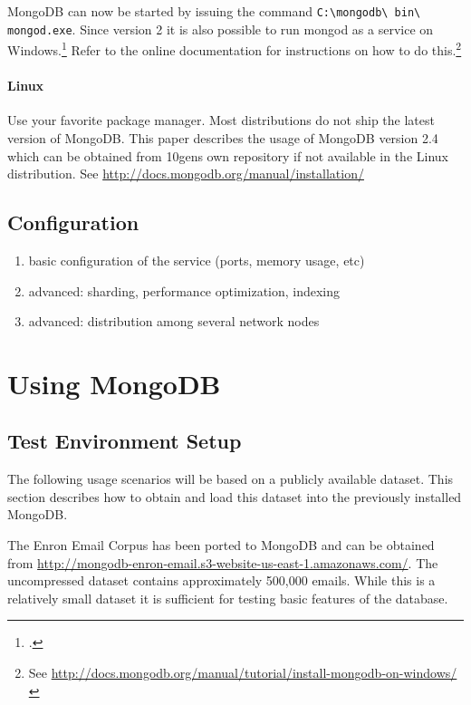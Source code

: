 MongoDB can now be started by issuing the command \texttt{C:\textbackslash mongodb\textbackslash\- bin\textbackslash\- mongod.exe}.
Since version 2 it is also possible to run mongod as a service on Windows.\footcite[Cf.][]{mongo_install_win} Refer
to the online documentation for instructions on how to do 
this.\footnote{See \url{http://docs.mongodb.org/manual/tutorial/install-mongodb-on-windows/}}

\paragraph{Linux}
\label{sec:installation-linux}
Use your favorite package manager.
Most distributions do not ship the latest version of MongoDB. This paper describes the usage of
MongoDB version 2.4 which can be obtained from 10gens own repository if not available in the
Linux distribution. See \url{http://docs.mongodb.org/manual/installation/}

\subsection{Configuration}
\label{sec:configuration}

\begin{enumerate}
  \item basic configuration of the service (ports, memory usage, etc)
  \item advanced: sharding, performance optimization, indexing
  \item advanced: distribution among several network nodes
\end{enumerate}
    
    
\newpage
\section{Using MongoDB}
\label{sec:usage}

\subsection{Test Environment Setup}
\label{sec:test-environment}

The following usage scenarios will be based on a publicly available dataset.
This section describes how to obtain and load this dataset into the previously
installed MongoDB.

The Enron Email Corpus has been ported to MongoDB and can be obtained from
\url{http://mongodb-enron-email.s3-website-us-east-1.amazonaws.com/}.
The uncompressed dataset contains approximately 500,000 emails.
While this is a relatively small dataset it is sufficient for
testing basic features of the database.

